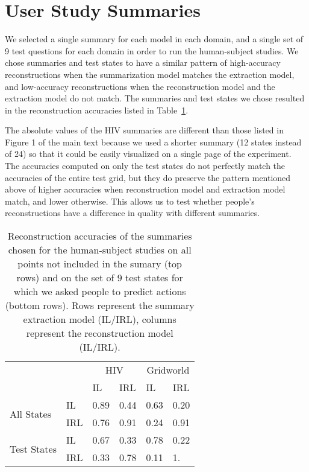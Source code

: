 \documentclass{article}
\begin{document}

\section{User Study Summaries}

We selected a single summary for each model in each domain, and a single set of 9 test questions for each domain in order to run the human-subject studies. We chose summaries and test states to have a similar pattern of high-accuracy reconstructions when the summarization model matches the extraction model, and low-accuracy reconstructions when the reconstruction model and the extraction model do not match. The summaries and test states we chose resulted in the reconstruction accuracies listed in Table~\ref{tab:gridworld_summaries}. 

The absolute values of the HIV summaries are different than those listed in Figure 1 of the main text because we used a shorter summary (12 states instead of 24) so that it could be easily visualized on a single page of the experiment. The accuracies computed on only the test states do not perfectly match the accuracies of the entire test grid, but they do preserve the pattern mentioned above of higher accuracies when reconstruction model and extraction model match, and lower otherwise. This allows us to test whether people's reconstructions have a difference in quality with different summaries.

\begin{table}[]
\centering
\begin{tabular}{ll|ll|ll}
\multicolumn{2}{c}{ } &            \multicolumn{2}{c}{HIV}  &  \multicolumn{2}{c}{Gridworld}  \\
            &               & IL   & IRL  &   IL   & IRL  \\ \hline 
\multirow{ 2}{*}{All States}  & IL            & 0.89 & 0.44 &  0.63 & 0.20 \\
            & IRL           & 0.76 & 0.91 & 0.24 & 0.91 \\ \hline 
\multirow{ 2}{*}{Test States} & IL            & 0.67 & 0.33 & 0.78 & 0.22 \\
            & IRL           & 0.33 & 0.78 & 0.11 & 1.  
\end{tabular}
\caption{Reconstruction accuracies of the summaries chosen for the human-subject studies on all points not included in the sumary (top rows) and on the set of 9 test states for which we asked people to predict actions (bottom rows). Rows represent the summary extraction model (IL/IRL), columns represent the reconstruction model (IL/IRL).}
\label{tab:gridworld_summaries}
\end{table}
\end{document}
